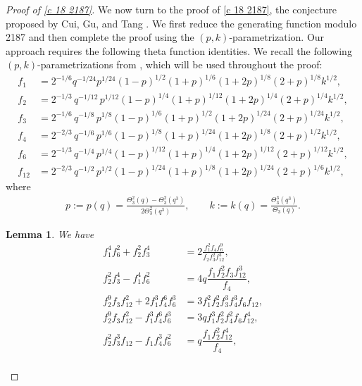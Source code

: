 \documentclass[12pt]{article}
\numberwithin{equation}{section}
\theoremstyle{plain}
\numberwithin{theorem}{section}
\newtheorem{lemma}[theorem]{Lemma}
\theoremstyle{definition}
\theoremstyle{remark}
\begin{document}
\begin{proof}[Proof of \eqref{c 18 2187}]
     We now turn to the proof of \eqref{c 18 2187}, the conjecture proposed by Cui, Gu, and Tang \cite{CGT25}. We first reduce the generating function modulo 2187 and then complete the proof using the $(p,k)$-parametrization.
    Our approach requires the following theta function identities.
    We recall the following $(p,k)$-parametrizations from \cite{AAW06}, which will be used throughout the proof:
    \begin{align*}
        f_1&=2^{-1/6} q^{-1/24} p^{1/24} (1 - p)^{1/2} (1+p)^{1/6} (1+2p )^{1/8} (2+p)^{1/8} k^{1/2},\\
        f_2&=2^{-1/3} \, q^{-1/12} \, p^{1/12} (1 - p)^{1/4} (1+p)^{1/12} (1+2p)^{1/4} (2+p)^{1/4} k^{1/2},\\
        f_3&=2^{-1/6} \, q^{-1/8} \, p^{1/8} (1 - p)^{1/6} (1+p)^{1/2} (1 + 2p)^{1/24} (2 + p)^{1/24} k^{1/2},\\
        f_4&=2^{-2/3} \, q^{-1/6} \, p^{1/6} (1 - p)^{1/8} (1+p)^{1/24} (1+2p )^{1/8} (2+p)^{1/2} k^{1/2},\\
        f_6&=2^{-1/3} \, q^{-1/4} \, p^{1/4} (1 - p)^{1/12} (1+p)^{1/4} (1+2p )^{1/12} (2+p)^{1/12} k^{1/2},\\
        f_{12}&=2^{-2/3} \, q^{-1/2} \, p^{1/2} (1 - p)^{1/24} (1+p)^{1/8} (1+2p)^{1/24} (2+p)^{1/6} k^{1/2},
    \end{align*}
    where
    \begin{align*}
        p:=p(q)=\frac{\Theta_3^2(q)-\Theta_3^2(q^3)}{2\Theta_3^2(q^3)}, \qquad
        k:=k(q)=\frac{\Theta_3^3(q^3)}{\Theta_3(q)}.
    \end{align*}
    \begin{lemma}
        We have
        \begin{align}
            f_1^4f_6^2+f_2^2 f_3^4&=2\frac{f_1^2 f_4 f_6^9}{f_2 f_3^2 f_{12}^3},\label{Id 1}\\
            f_2^2 f_3^4- f_1^4 f_6^2&= 4q\dfrac{f_1f_2^2f_3f_{12}^3}{f_4},\label{Id 4}\\
            f_2^9f_3 f_{12}^2+2 f_1^3 f_4^6 f_6^3&=3 f_1^2 f_2^2 f_3^3 f_4^3 f_6 f_{12},\label{Id 2}\\
            f_2^9 f_3 f_{12}^2-f_1^3 f_4^6 f_6^3&=3q f_1^3 f_2^2 f_4^2 f_6 f_{12}^4, \label{Id 5}\\
            f_2^2f_3^3f_{12}-f_1f_4^3f_6^2&=q \dfrac{f_1f_2^2f_{12}^4}{f_4}, \label{Id 6}\\

\end{align}
\end{lemma}
\end{proof}
\end{document}
